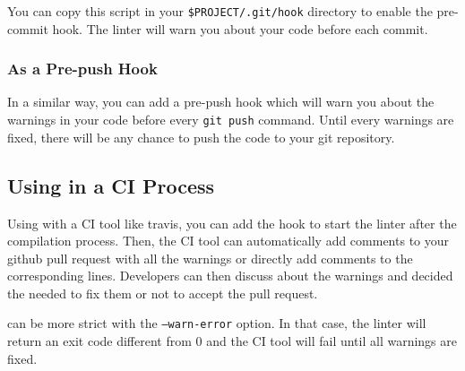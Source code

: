 You can copy this script in your {\tt \$PROJECT/.git/hook} directory to enable
the pre-commit hook. The linter will warn you about your code before each
commit.

\subsubsection*{As a Pre-push Hook}
In a similar way, you can add a pre-push hook which will warn you about the
warnings in your code before every {\tt git push} command. Until every warnings
are fixed, there will be any chance to push the code to your git repository.

\subsection{Using in a CI Process}
Using \ocplint{} with a CI tool like travis, you can add the hook to start the
linter after the compilation process. Then, the CI tool can automatically add
comments to your github pull request with all the warnings or directly add
comments to the corresponding lines. Developers can then discuss about the
warnings and decided the needed to fix them or not to accept the pull request.

\ocplint{} can be more strict with the {\tt --warn-error} option. In that case,
the linter will return an exit code different from 0 and the CI tool will fail
until all warnings are fixed.

